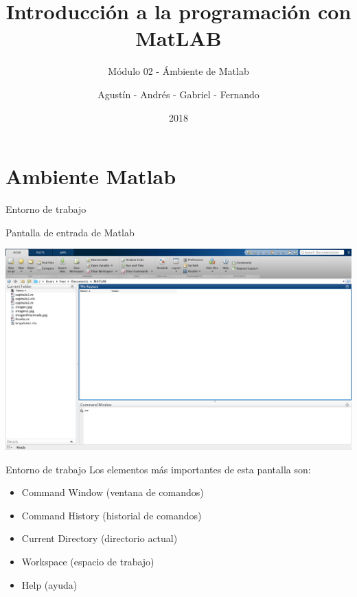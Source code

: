 \documentclass{bredelebeamer}
\title[Programación en MatLAB]{Introducción a la programación con MatLAB}
\subtitle{Módulo 02 - Ámbiente de Matlab}
\author{Agustín - Andrés - Gabriel - Fernando\inst{1}}
\institute[UTN.BA]
{
  \inst{1}%
  Universidad Tecnológica Nacional\\
  Facultad Regional Buenos Aires
  }
\date{2018}
\begin{document}
\begin{frame}
  \titlepage 
\end{frame}




\section{Ambiente Matlab}

\begin{frame}{Entorno de trabajo}
\begin{center}
Pantalla de entrada de Matlab
\end{center}
\begin{center}
\includegraphics[scale=0.17]{images/pantalla1.png}
\end{center}
\end{frame}

\begin{frame}{Entorno de trabajo}
Los elementos más importantes de esta pantalla son:\\
\begin{itemize}
\item Command Window (ventana de comandos)
\item Command History (historial de comandos)
\item Current Directory (directorio actual)
\item Workspace (espacio de trabajo)
\item Help (ayuda)
\end{itemize}
\end{frame}
\end{document}
